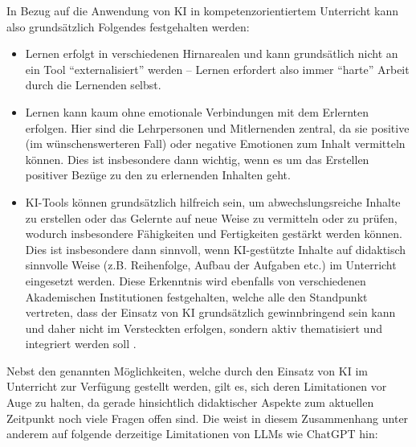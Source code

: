 In Bezug auf die Anwendung von \gls{KI} in kompetenzorientiertem Unterricht kann also grundsätzlich Folgendes festgehalten werden:

\begin{itemize}
\item Lernen erfolgt in verschiedenen Hirnarealen und kann grundsätlich nicht an ein Tool ``externalisiert'' werden -- Lernen erfordert also immer ``harte'' Arbeit durch die Lernenden selbst.
\item Lernen kann kaum ohne emotionale Verbindungen mit dem Erlernten erfolgen. Hier sind die Lehrpersonen und Mitlernenden zentral, da sie positive (im wünschenswerteren Fall) oder negative Emotionen zum Inhalt vermitteln können. Dies ist insbesondere dann wichtig, wenn es um das Erstellen positiver Bezüge zu den zu erlernenden Inhalten geht.
\item \gls{KI}-Tools können grundsätzlich hilfreich sein, um abwechslungsreiche Inhalte zu erstellen oder das Gelernte auf neue Weise zu vermitteln oder zu prüfen, wodurch insbesondere Fähigkeiten und Fertigkeiten gestärkt werden können. Dies ist insbesondere dann sinnvoll, wenn \gls{KI}-gestützte Inhalte auf didaktisch sinnvolle Weise (z.B. Reihenfolge, Aufbau der Aufgaben etc.) im Unterricht eingesetzt werden. Diese Erkenntnis wird ebenfalls von verschiedenen Akademischen Institutionen festgehalten, welche alle den Standpunkt vertreten, dass der Einsatz von \gls{KI} grundsätzlich gewinnbringend sein kann und daher nicht im Versteckten erfolgen, sondern aktiv thematisiert und integriert werden soll \cite{bbz,bfh}.
\end{itemize}

Nebst den genannten Möglichkeiten, welche durch den Einsatz von \gls{KI} im Unterricht zur Verfügung gestellt werden, gilt es, sich deren Limitationen vor Auge zu halten, da gerade hinsichtlich didaktischer Aspekte zum aktuellen Zeitpunkt noch viele Fragen offen sind. Die \textcite{bfh} weist in diesem Zusammenhang unter anderem auf folgende derzeitige Limitationen von \glspl{LLM} wie ChatGPT hin:

